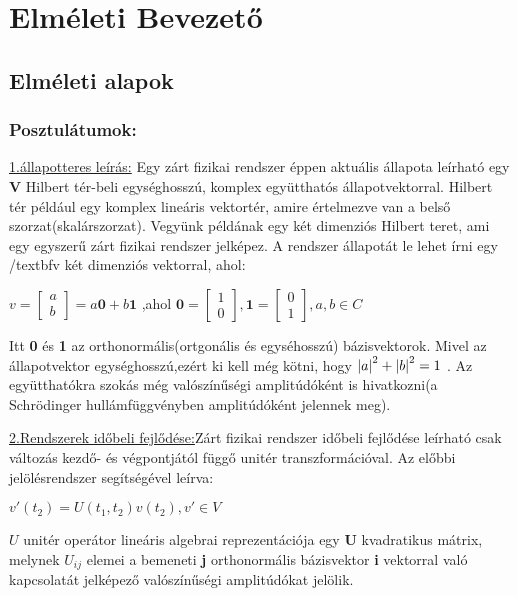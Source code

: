 

\chapter{Elméleti Bevezető}

\section{Elméleti alapok}

\subsection{Posztulátumok: \cite{kvantkonyv1}} 
\underline{1.állapotteres leírás:} Egy zárt fizikai rendszer éppen aktuális állapota leírható egy \textbf{V} Hilbert tér-beli egységhosszú, komplex együtthatós állapotvektorral. Hilbert tér például egy komplex lineáris vektortér, amire értelmezve van a belső szorzat(skalárszorzat). 
Vegyünk példának egy két dimenziós Hilbert teret, ami egy egyszerű zárt fizikai rendszer jelképez. A rendszer állapotát le lehet írni egy /textbf{v} két dimenziós vektorral, ahol:\\
\begin{center}
$ v= \begin{bmatrix} a\\b \end{bmatrix} = a\textbf{0}+ b\textbf{1} $ ,ahol 
$\textbf{0}=\begin{bmatrix} 1\\0 \end{bmatrix} , \textbf{1}=\begin{bmatrix} 0\\1 \end{bmatrix} ,   a,b \in C$
\end{center}
Itt \textbf{0} és \textbf{1} az orthonormális(ortgonális és egyséhosszú) bázisvektorok. Mivel az állapotvektor egységhosszú,ezért ki kell még kötni, hogy 
$\abs{a}^2+\abs{b}^2 =1$ . Az együtthatókra szokás még valószínűségi amplitúdóként is hivatkozni(a Schrödinger hullámfüggvényben amplitúdóként jelennek meg).

\underline{2.Rendszerek időbeli fejlődése:}Zárt fizikai rendszer időbeli fejlődése leírható csak változás kezdő- és végpontjától függő unitér transzformációval. Az előbbi jelölésrendszer segítségével leírva: 
\begin{center}
$v'(t_2) = U(t_1,t_2)v(t_2), v' \in V$
\end{center}
$ U $ unitér operátor lineáris algebrai reprezentációja egy \textbf{U} kvadratikus mátrix, melynek $U_{ij}$ elemei a bemeneti \textbf{j} orthonormális bázisvektor \textbf{i} vektorral való kapcsolatát jelképező valószínűségi amplitúdókat jelölik.\\

